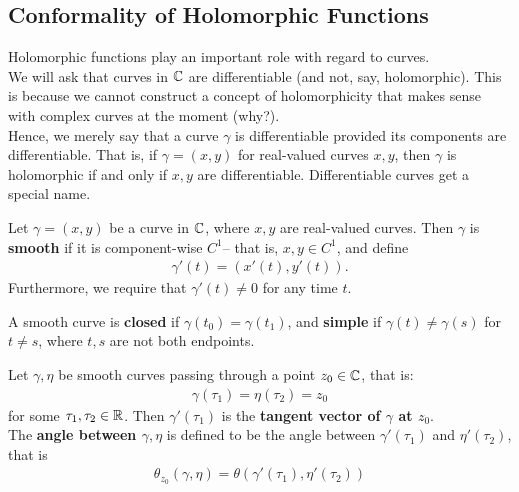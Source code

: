 \documentclass{memoir}
\begin{document}
\subsection{Conformality of Holomorphic Functions}
\label{sub:conformality_of_holomorphic_functions}


Holomorphic functions play an important role with regard to curves.\\

We will ask that curves in \(\mathbb{C}\) are differentiable (and not, say, holomorphic). This is because we cannot construct a concept of holomorphicity that makes sense with complex curves at the moment (why?).\\

Hence, we merely say that a curve \(\gamma \) is differentiable provided its components are differentiable. That is, if \(\gamma = (x,y)\) for real-valued curves \(x,y\), then \(\gamma \) is holomorphic if and only if \(x,y\) are differentiable. Differentiable curves get a special name.

\begin{defn}[Smooth]
	Let \(\gamma =(x,y)\) be a curve in \(\mathbb{C}\), where \(x,y\) are real-valued curves. Then \(\gamma \) is \textbf{smooth} if it is component-wise \(C^{1}\)-- that is, \(x,y \in C^{1}\), and define
	\begin{align*}
		\gamma '(t) = (x'(t),y'(t)).
	\end{align*}
	Furthermore, we require that \(\gamma'(t) \neq 0\) for any time \(t\).
\end{defn}
A smooth curve is \textbf{closed} if \(\gamma(t_0) = \gamma (t_1)\), and \textbf{simple} if \(\gamma(t) \neq \gamma(s)\) for \(t\neq s\), where \(t,s\) are not both endpoints.

\begin{defn}
	Let \(\gamma ,\eta \) be smooth curves passing through a point \(z_0 \in \mathbb{C}\), that is:
	\begin{align*}
		\gamma (\tau_1) = \eta (\tau_2) = z_0
	\end{align*}
	for some \(\tau_1,\tau_2 \in \mathbb{R}\). Then \(\gamma '(\tau_1)\) is the \textbf{tangent vector of \(\gamma \) at \(z_0\)}.\\

	The \textbf{angle between \(\gamma ,\eta \)} is defined to be the angle between \(\gamma'(\tau_1)\) and \(\eta'(\tau_2)\), that is
	\begin{align*}
		\theta_{z_0} (\gamma ,\eta ) = \theta (\gamma'(\tau_1), \eta'(\tau_2))
	\end{align*}
\end{defn}
\end{document}
